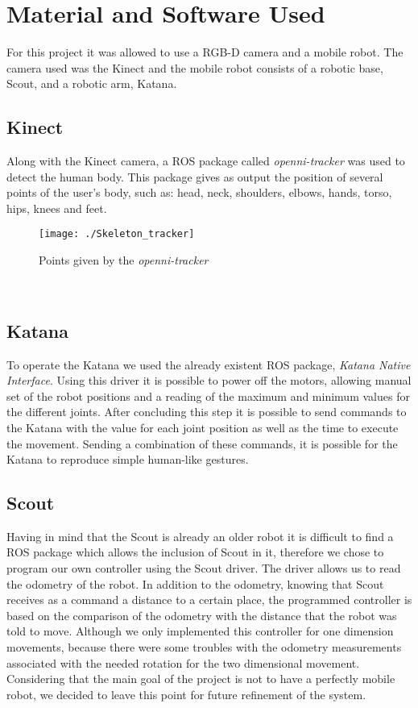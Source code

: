 
\section{Material and Software Used}
For this project it was allowed to use a RGB-D camera and a mobile robot. The camera used was the Kinect and the mobile robot consists of a robotic base, Scout, and a robotic arm, Katana.\\

\subsection{Kinect}
Along with the Kinect camera, a ROS package called \textit{openni-tracker} was used to detect the human body. This package gives as output the position of several points of the user's body, such as: head, neck, shoulders, elbows, hands, torso, hips, knees and feet.
\begin{figure}[!h]
	\centering
		\texttt{[image: ./Skeleton\_tracker]}
	\caption{Points given by the \textit{openni-tracker}}
\end{figure}\\

\subsection{Katana}
\label{Material: Katana}
To operate the Katana we used the already existent ROS package, \textit{Katana Native Interface}. Using this driver it is possible to power off the motors, allowing manual set of the robot positions and a reading of the maximum and minimum values for the different joints. After concluding this step it is possible to send commands to the Katana with the value for each joint position as well as the time to execute the movement. Sending a combination of these commands, it is possible for the Katana to reproduce simple human-like gestures.\\

\subsection{Scout}
Having in mind that the Scout is already an older robot it is difficult to find a ROS package which allows the inclusion of Scout in it, therefore we chose to program our own controller using the Scout driver. The driver allows us to read the odometry of the robot. In addition to the odometry, knowing that Scout receives as a command a distance to a certain place, the programmed controller is based on the comparison of the odometry with the distance that the robot was told to move. Although we only implemented this controller for one dimension movements, because there were some troubles with the odometry measurements associated with the needed rotation for the two dimensional movement. Considering that the main goal of the project is not to have a perfectly mobile robot, we decided to leave this point for future refinement of the system.\\
